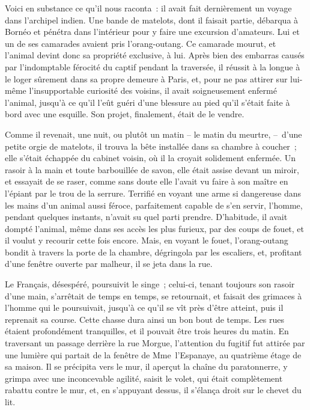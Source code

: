 \documentclass[french,twoside]{book} %
\begin{document}
Voici en substance ce qu’il nous raconta : il avait fait dernièrement un voyage dans l’archipel indien. Une bande de matelots, dont il faisait partie, débarqua à Bornéo et pénétra dans l’intérieur pour y faire une excursion d’amateurs. Lui et un de ses camarades avaient pris l’orang-outang. Ce camarade mourut, et l’animal devint donc sa propriété exclusive, à lui. Après bien des embarras causés par l’indomptable férocité du captif pendant la traversée, il réussit à la longue à le loger sûrement dans sa propre demeure à Paris, et, pour ne pas attirer sur lui-même l’insupportable curiosité des voisins, il avait soigneusement enfermé l’animal, jusqu’à ce qu’il l’eût guéri d’une blessure au pied qu’il s’était faite à bord avec une esquille. Son projet, finalement, était de le vendre.\par
Comme il revenait, une nuit, ou plutôt un matin – le matin du meurtre, – d’une petite orgie de matelots, il trouva la bête installée dans sa chambre à coucher ; elle s’était échappée du cabinet voisin, où il la croyait solidement enfermée. Un rasoir à la main et toute barbouillée de savon, elle était assise devant un miroir, et essayait de se raser, comme sans doute elle l’avait vu faire à son maître en l’épiant par le trou de la serrure. Terrifié en voyant une arme si dangereuse dans les mains d’un animal aussi féroce, parfaitement capable de s’en servir, l’homme, pendant quelques instants, n’avait su quel parti prendre. D’habitude, il avait dompté l’animal, même dans ses accès les plus furieux, par des coups de fouet, et il voulut y recourir cette fois encore. Mais, en voyant le fouet, l’orang-outang bondit à travers la porte de la chambre, dégringola par les escaliers, et, profitant d’une fenêtre ouverte par malheur, il se jeta dans la rue.\par
Le Français, désespéré, poursuivit le singe ; celui-ci, tenant toujours son rasoir d’une main, s’arrêtait de temps en temps, se retournait, et faisait des grimaces à l’homme qui le poursuivait, jusqu’à ce qu’il se vît près d’être atteint, puis il reprenait sa course. Cette chasse dura ainsi un bon bout de temps. Les rues étaient profondément tranquilles, et il pouvait être trois heures du matin. En traversant un passage derrière la rue Morgue, l’attention du fugitif fut attirée par une lumière qui partait de la fenêtre de Mme l’Espanaye, au quatrième étage de sa maison. Il se précipita vers le mur, il aperçut la chaîne du paratonnerre, y grimpa avec une inconcevable agilité, saisit le volet, qui était complètement rabattu contre le mur, et, en s’appuyant dessus, il s’élança droit sur le chevet du lit.\par
\end{document}
